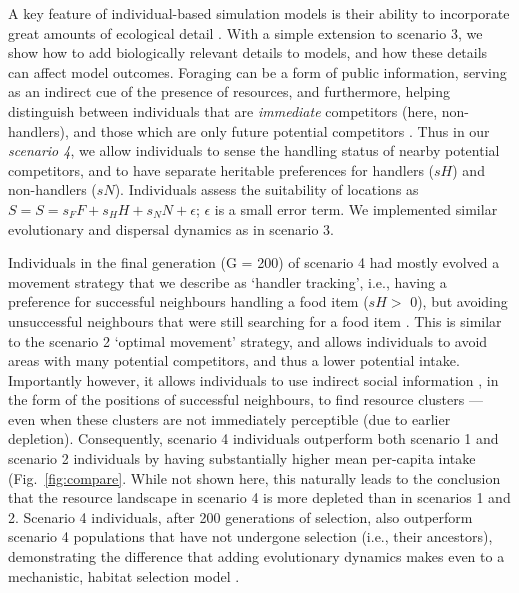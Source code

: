 A key feature of individual-based simulation models is their ability to incorporate great amounts of ecological detail \citep{deangelis2019}.
With a simple extension to scenario 3, we show how to add biologically relevant details to models, and how these details can affect model outcomes.
Foraging can be a form of public information, serving as an indirect cue of the presence of resources, and furthermore, helping distinguish between individuals that are \textit{immediate} competitors (here, non-handlers), and those which are only future potential competitors \citep[][; here, handlers]{dall2005,giraldeau2018,beauchamp2008,beauchamp2013}.
Thus in our \textit{scenario 4}, we allow individuals to sense the handling status of nearby potential competitors, and to have separate heritable preferences for handlers ($sH$) and non-handlers ($sN$).
Individuals assess the suitability of locations as $S = S = s_FF + s_HH + s_NN + \epsilon$; $\epsilon$ is a small error term.
We implemented similar evolutionary and dispersal dynamics as in scenario 3.

Individuals in the final generation (G = 200) of scenario 4 had mostly evolved a movement strategy that we describe as `handler tracking', i.e., having a preference for successful neighbours handling a food item ($sH >$ 0), but avoiding unsuccessful neighbours that were still searching for a food item \citep[($sN <$ 0)][]{gupte2021a,gupte2022c}.
This is similar to the scenario 2 `optimal movement' strategy, and allows individuals to avoid areas with many potential competitors, and thus a lower potential intake.
Importantly however, it allows individuals to use indirect social information \citep{dall2005,spiegel2016a}, in the form of the positions of successful neighbours, to find resource clusters --- even when these clusters are not immediately perceptible (due to earlier depletion).
Consequently, scenario 4 individuals outperform both scenario 1 and scenario 2 individuals by having substantially higher mean per-capita intake (Fig.~\ref{fig:compare}.
While not shown here, this naturally leads to the conclusion that the resource landscape in scenario 4 is more depleted than in scenarios 1 and 2.
Scenario 4 individuals, after 200 generations of selection, also outperform scenario 4 populations that have not undergone selection (i.e., their ancestors), demonstrating the difference that adding evolutionary dynamics makes even to a mechanistic, habitat selection model \citep[such as][]{white2018}.

